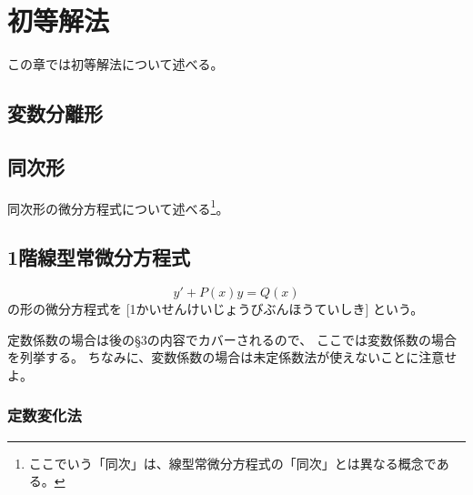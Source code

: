 \documentclass[report]{jlreq}
\begin{document}
%
\chapter{初等解法}

この章では初等解法について述べる。

%
\section{変数分離形}

\TODO{}


%
\section{同次形}

同次形の微分方程式について述べる\footnote{
    ここでいう「同次」は、線型常微分方程式の「同次」とは異なる概念である。
}。

\TODO{}


%
\section{1階線型常微分方程式}

\begin{definition}[1階線型常微分方程式]
    \begin{equation}
        y' + P(x) y = Q(x)
    \end{equation}
    の形の微分方程式を
    [1かいせんけいじょうびぶんほうていしき]
    という。
\end{definition}

定数係数の場合は後の\S{3}の内容でカバーされるので、
ここでは変数係数の場合を列挙する。
ちなみに、変数係数の場合は未定係数法が使えないことに注意せよ。

\subsection{定数変化法}
\end{document}
